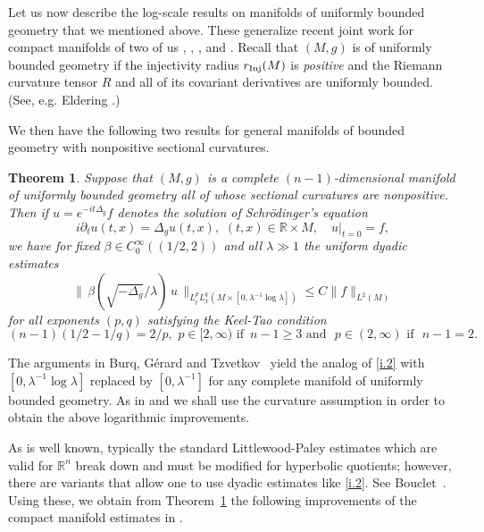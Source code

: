 \documentclass[10pt]{amsart}
\newtheorem{theorem}{Theorem}
\newcommand{\Rn}{{\mathbb R}^n}
\newcommand{\la}{\lambda}
\newcommand{\Inj}{r_{\rm{Inj}}}
\newcommand{\1}{{\bf 1}}
\newcommand{\R}{{\mathbb R}}
\begin{document}
Let us now describe the 
log-scale results on manifolds of uniformly  bounded geometry that we mentioned above.
These generalize recent joint work for compact manifolds of two of us
\cite{BHSsp}, \cite{SBLOg},  \cite{HSp}, \cite{HSqm} and \cite{HSst}.   Recall that $(M,g)$ is of uniformly
bounded geometry if the injectivity radius $\Inj(M)$ is {\em positive} and the Riemann curvature tensor
$R$ and all of its covariant derivatives are uniformly bounded.  (See, e.g. 
Eldering \cite[\S 2.1]{normhyp}.)




We then have the following two results for general manifolds of bounded geometry with
nonpositive sectional curvatures.


\begin{theorem}\label{bgst}  Suppose that $(M,g)$ is a complete $(n-1)$-dimensional manifold of uniformly bounded geometry
all of whose sectional curvatures are nonpositive.  Then if $u=e^{-it\Delta_g}f$ denotes the solution of
Schr\"odinger's equation
\begin{equation}\label{i.1}
i\partial_t u(t,x)=\Delta_g u(t,x), \, \, (t,x)\in \R \times M, \quad u|_{t=0}=f,
\end{equation}
we have for fixed $\beta\in C^\infty_0((1/2,2))$ and all $\la\gg 1$ the uniform dyadic estimates
\begin{equation}\label{i.2}
\bigl\| \, \beta(\sqrt{-\Delta_g}/\la) \, u\, \bigr\|_{L^p_tL^q_x(M\times [0,\la^{-1}\log\la])}\le C\|f\|_{L^2(M)}
\end{equation}
for all exponents $(p,q)$ satisfying the Keel-Tao condition
\begin{equation}\label{i.3}
(n-1)(1/2-1/q)=2/p, \, \, p\in [2,\infty) \, \, \text{if } \, n-1\ge 3 \, \, \text{and } \, 
\, p\in (2,\infty) \, \, \text{if } \, \, n-1=2.
\end{equation}
\end{theorem}


The arguments in Burq, G\'erard and Tzvetkov~\cite{BGT} yield the analog of \eqref{i.2}
with $[0,\la^{-1}\log\la]$ replaced by $[0,\la^{-1}]$
 for any complete manifold
of uniformly bounded geometry.  As in \cite{BHSsp} and \cite{HSst} we shall use the curvature
assumption in order to obtain the above logarithmic improvements.


As is well known, typically the standard Littlewood-Paley estimates which are valid for
$\Rn$ break down and must be modified for hyperbolic quotients; however, there are
variants that allow one to use dyadic estimates like \eqref{i.2}.  See Bouclet~\cite{Boulp}.
Using these, we obtain from Theorem~\ref{bgst} the following improvements of the compact
manifold estimates in \cite{BGT}.
\end{document}
